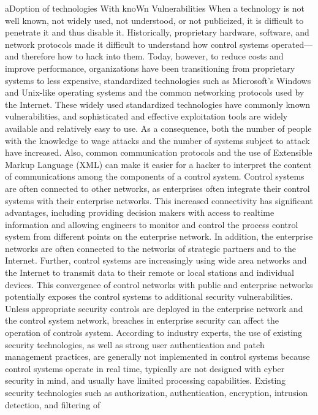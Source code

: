 \documentclass{article}
\begin{document}
aDoption of technologies With knoWn Vulnerabilities When a technology is
not well known, not widely used, not understood, or not publicized, it
is difficult to penetrate it and thus disable it. Historically,
proprietary hardware, software, and network protocols made it difficult
to understand how control systems operated---and therefore how to hack
into them. Today, however, to reduce costs and improve performance,
organizations have been transitioning from proprietary systems to less
expensive, standardized technologies such as Microsoft's Windows and
Unix-like operating systems and the common networking protocols used by
the Internet. These widely used standardized technologies have commonly
known vulnerabilities, and sophisticated and effective exploitation
tools are widely available and relatively easy to use. As a consequence,
both the number of people with the knowledge to wage attacks and the
number of systems subject to attack have increased. Also, common
communication protocols and the use of Extensible Markup Language (XML)
can make it easier for a hacker to interpret the content of
communications among the components of a control system. Control systems
are often connected to other networks, as enterprises often integrate
their control systems with their enterprise networks. This increased
connectivity has significant advantages, including providing decision
makers with access to realtime information and allowing engineers to
monitor and control the process control system from different points on
the enterprise network. In addition, the enterprise networks are often
connected to the networks of strategic partners and to the Internet.
Further, control systems are increasingly using wide area networks and
the Internet to transmit data to their remote or local stations and
individual devices. This convergence of control networks with public and
enterprise networks potentially exposes the control systems to
additional security vulnerabilities. Unless appropriate security
controls are deployed in the enterprise network and the control system
network, breaches in enterprise security can affect the operation of
controls system. According to industry experts, the use of existing
security technologies, as well as strong user authentication and patch
management practices, are generally not implemented in control systems
because control systems operate in real time, typically are not designed
with cyber security in mind, and usually have limited processing
capabilities. Existing security technologies such as authorization,
authentication, encryption, intrusion detection, and filtering of
\end{document}
